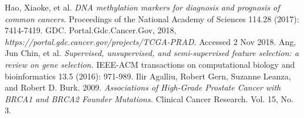 \documentclass[a4paper,oneside]{article}
\begin{document}
\begin{thebibliography}{1}
 Hao, Xiaoke, et al. {\em DNA methylation markers for diagnosis and prognosis of common cancers.} Proceedings of the National Academy of Sciences 114.28 (2017): 7414-7419.
 GDC. Portal.Gdc.Cancer.Gov, 2018, {\em https://portal.gdc.cancer.gov/projects/TCGA-PRAD.} Accessed 2 Nov 2018.
 Ang, Jun Chin, et al. {\em Supervised, unsupervised, and semi-supervised feature selection: a review on gene selection.} IEEE-ACM transactions on computational biology and bioinformatics 13.5 (2016): 971-989.
 Ilir Agalliu, Robert Gern, Suzanne Leanza, and Robert D. Burk. 2009. {\em Associations of High-Grade Prostate Cancer with BRCA1 and BRCA2 Founder Mutations.} Clinical Cancer Research. Vol. 15, No. 3.
\end{thebibliography}
\end{document}
